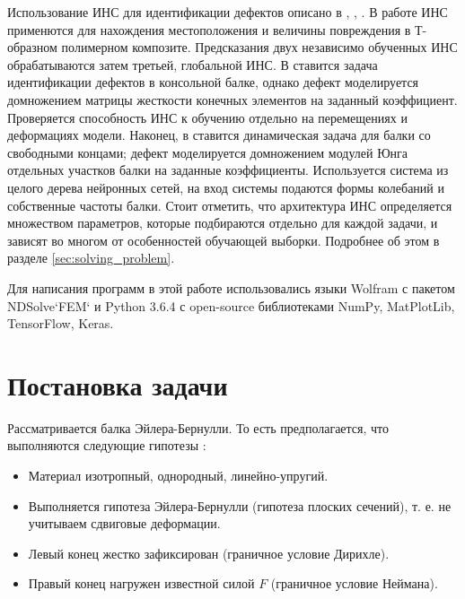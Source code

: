 \documentclass[a4paper,12pt]{article}
\theoremstyle{remark}
\begin{document}
	Использование ИНС для идентификации дефектов описано в \cite{artificial_neural_networks_in_damage_detection}, \cite{randomized_trained_neural_networks}, \cite{multi_stage_neural_networks}. В работе \cite{artificial_neural_networks_in_damage_detection} ИНС применются для нахождения местоположения и величины повреждения в Т-образном полимерном композите. Предсказания двух независимо обученных ИНС обрабатываются затем третьей, глобальной ИНС. В \cite{randomized_trained_neural_networks} ставится задача идентификации дефектов в консольной балке, однако дефект моделируется домножением матрицы жесткости конечных элементов на заданный коэффициент. Проверяется способность ИНС к обучению отдельно на перемещениях и деформациях модели. Наконец, в \cite{multi_stage_neural_networks} ставится динамическая задача для балки со свободными концами; дефект моделируется домножением модулей Юнга отдельных участков балки на заданные коэффициенты. Используется система из целого дерева нейронных сетей, на вход системы подаются формы колебаний и собственные частоты балки. Стоит отметить, что архитектура ИНС определяется множеством параметров, которые подбираются отдельно для каждой задачи, и зависят во многом от особенностей обучающей выборки. Подробнее об этом в разделе \ref{sec:solving_problem}.
	
	Для написания программ в этой работе использовались языки Wolfram с пакетом NDSolve`FEM` и Python 3.6.4 с open-source библиотеками NumPy, MatPlotLib, TensorFlow, Keras.
	
	\newpage
	\section{Постановка задачи}
	\label{sec:formulation_problem}
	
	Рассматривается балка Эйлера-Бернулли. То есть предполагается, что выполняются следующие гипотезы \cite{crack_detection}:
	\begin{itemize}[itemsep=0cm, topsep=0.2cm]
		\item Материал изотропный, однородный, линейно-упругий.
		\item Выполняется гипотеза Эйлера-Бернулли (гипотеза плоских сечений), т. е. не учитываем сдвиговые деформации.
		\item Левый конец жестко зафиксирован (граничное условие Дирихле).
		\item Правый конец нагружен известной силой $F$ (граничное условие Неймана).
	\end{itemize}
\end{document}
